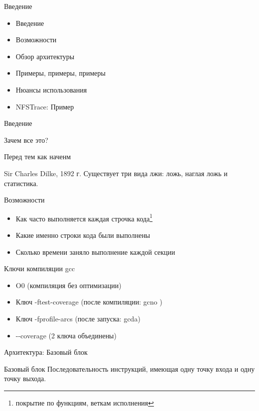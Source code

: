 \begin{frame}{Введение}
  \begin{itemize}
    \item Введение
    \item Возможности
    \item Обзор архитектуры
    \item Примеры, примеры, примеры 
    \item Нюансы использования
    \item NFSTrace: Пример
  \end{itemize}
\end{frame}

\begin{frame}{Введение}
  \begin{center}
    \Large Зачем все это?
  \end{center}
\end{frame}

\begin{frame}{Перед тем как наченм}
  \begin{block}{Sir Charles Dilke, 1892 г.}
    Существует три вида лжи: ложь, наглая ложь и статистика.
  \end{block}
\end{frame}

\begin{frame}{Возможности}
  \begin{itemize}
    \item Как часто выполняется каждая строчка кода\footnote{покрытие по функциям, веткам исполнения}
    \item Какие именно строки кода были выполнены
    \item Сколько времени заняло выполнение каждой секции
  \end{itemize}
\end{frame}

\begin{frame}{Ключи компиляции gcc}
  \begin{itemize}
    \item O0 (компиляция без оптимизации)
    \item Ключ -ftest-coverage (после компиляции: gcno )
    \item Ключ -fprofile-arcs (после запуска:  gcda)
    \item -{}-coverage (2 ключа объединены)
  \end{itemize}
\end{frame}

\begin{frame}{Архитектура: Базовый блок}
    \begin{block}{Базовый блок}
        Последовательность инструкций, имеющая одну точку входа и одну точку выхода.
    \end{block}
\end{frame}

